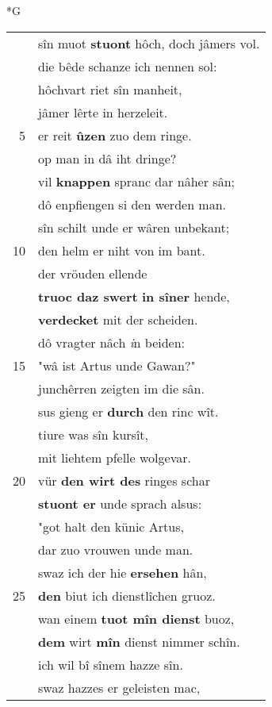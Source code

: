 \documentclass[8pt,a4paper,notitlepage]{article}
\begin{document}
\begin{table}[ht]
\begin{minipage}[t]{0.5\linewidth}
\small
\begin{center}*G
\end{center}
\begin{tabular}{rl}
 & sîn muot \textbf{stuont} hôch, doch jâmers vol.\\ 
 & die bêde schanze ich nennen sol:\\ 
 & hôchvart riet sîn manheit,\\ 
 & jâmer lêrte in herzeleit.\\ 
5 & er reit \textbf{ûzen} zuo dem ringe.\\ 
 & op man in dâ iht dringe?\\ 
 & vil \textbf{knappen} spranc dar nâher sân;\\ 
 & dô enpfiengen si den werden man.\\ 
 & sîn schilt unde er wâren unbekant;\\ 
10 & den helm er niht von im bant.\\ 
 & der vröuden ellende\\ 
 & \textbf{truoc daz swert} \textbf{in sîner} hende,\\ 
 & \textbf{verdecket} mit der scheiden.\\ 
 & dô vragter nâch \textit{i}n beiden:\\ 
15 & "wâ ist Artus unde Gawan?"\\ 
 & junchêrren zeigten im die sân.\\ 
 & sus gieng er \textbf{durch} den rinc wît.\\ 
 & tiure was sîn kursît,\\ 
 & mit liehtem pfelle wolgevar.\\ 
20 & vür \textbf{den wirt des} ringes schar\\ 
 & \textbf{stuont er} unde sprach alsus:\\ 
 & "got halt den künic Artus,\\ 
 & dar zuo vrouwen unde man.\\ 
 & swaz ich der hie \textbf{ersehen} hân,\\ 
25 & \textbf{den} biut ich dienstlîchen gruoz.\\ 
 & wan einem \textbf{tuot mîn dienst} buoz,\\ 
 & \textbf{dem} wirt \textbf{mîn} dienst nimmer schîn.\\ 
 & ich wil bî sînem hazze sîn.\\ 
 & swaz hazzes er geleisten mac,\\ 

\end{tabular}
\end{minipage}
\end{table}
\end{document}
